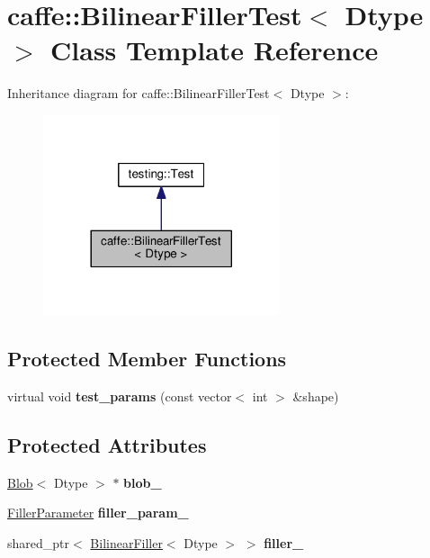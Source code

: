 \hypertarget{classcaffe_1_1_bilinear_filler_test}{}\section{caffe\+:\+:Bilinear\+Filler\+Test$<$ Dtype $>$ Class Template Reference}
\label{classcaffe_1_1_bilinear_filler_test}


Inheritance diagram for caffe\+:\+:Bilinear\+Filler\+Test$<$ Dtype $>$\+:
\nopagebreak
\begin{figure}[H]
\begin{center}
\leavevmode
\includegraphics[width=197pt]{classcaffe_1_1_bilinear_filler_test__inherit__graph}
\end{center}
\end{figure}
\subsection*{Protected Member Functions}
\begin{DoxyCompactItemize}
\item 
\mbox{\label{classcaffe_1_1_bilinear_filler_test_a9e50f6a361fc82606e84101a96ae0e0a}} 
virtual void {\bfseries test\+\_\+params} (const vector$<$ int $>$ \&shape)
\end{DoxyCompactItemize}
\subsection*{Protected Attributes}
\begin{DoxyCompactItemize}
\item 
\mbox{\label{classcaffe_1_1_bilinear_filler_test_ad3441a43e879b7cfe78f00a1c6f59076}} 
\mbox{\hyperlink{classcaffe_1_1_blob}{Blob}}$<$ Dtype $>$ $\ast$ {\bfseries blob\+\_\+}
\item 
\mbox{\label{classcaffe_1_1_bilinear_filler_test_a8b0c7ca112ce4bdf15958d42b67c733a}} 
\mbox{\hyperlink{classcaffe_1_1_filler_parameter}{Filler\+Parameter}} {\bfseries filler\+\_\+param\+\_\+}
\item 
\mbox{\label{classcaffe_1_1_bilinear_filler_test_afdbe5a1aa9c4f49b22ac808375ff7445}} 
shared\+\_\+ptr$<$ \mbox{\hyperlink{classcaffe_1_1_bilinear_filler}{Bilinear\+Filler}}$<$ Dtype $>$ $>$ {\bfseries filler\+\_\+}
\end{DoxyCompactItemize}
